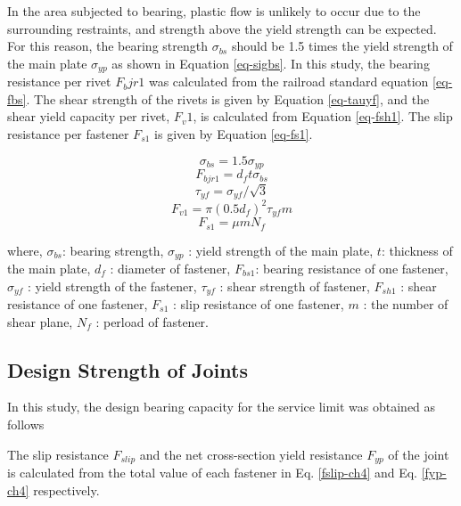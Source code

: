 In the area subjected to bearing, plastic flow is unlikely to occur due to the surrounding restraints, and strength above the yield strength can be expected. For this reason, the bearing strength $\sigma_{bs}$ should be 1.5 times the yield strength of the main plate $\sigma_{yp}$ as shown in Equation \ref{eq-sigbs}. In this study, the bearing resistance per rivet $F_bjr1$ was calculated from the railroad standard equation \ref{eq-fbs}. The shear strength of the rivets is given by Equation \ref{eq-tauyf}, and the shear yield capacity per rivet, $F_v1$, is calculated from Equation \ref{eq-fsh1}. The slip resistance per fastener $F_{s1}$ is given by Equation \ref{eq-fs1}.

\begin{equation}\label{eq-sigbs}
    \sigma_{bs}=1.5\sigma_{yp}
\end{equation}
\begin{equation}\label{eq-fbs}
    F_{bjr1}=d_f t\sigma_{bs}
\end{equation}
\begin{equation}\label{eq-tauyf}
    \tau_{yf}=\sigma_{yf}/\sqrt{3}
\end{equation}
\begin{equation}\label{eq-fsh1}
    F_{v1}=\pi (0.5d_f)^2 \tau_{yf} m
\end{equation}
\begin{equation}\label{eq-fs1}
    F_{s1}=\mu m N_f
\end{equation}

where, $\sigma_{bs}$: bearing strength, $\sigma_{yp}$ : yield strength of the main plate, $t$: thickness of the main plate, $d_f$ : diameter of fastener, $F_{bs1}$: bearing resistance of one fastener, $\sigma_{yf}$ : yield strength of the fastener, $\tau_{yf}$ : shear strength of fastener, $F_{sh1}$ : shear resistance of one fastener, $F_{s1}$ : slip resistance of one fastener, $m$ : the number of shear plane, $N_f$ : perload of fastener.


\subsection{Design Strength of Joints}

In this study, the design bearing capacity for the service limit was obtained as follows

The slip resistance $F_{slip}$ and the net cross-section yield resistance 
$F_{yp}$ of the joint is calculated from the total value of each fastener in Eq. \ref{fslip-ch4} and Eq. \ref{fyp-ch4} respectively.


